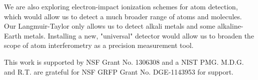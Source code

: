 \documentclass[twocolumn,prl,showpacs,superscriptaddress]{revtex4-1}   %
\begin{document}
We are also exploring electron-impact ionization schemes for atom detection, which would allow us to detect a much broader range of atoms and molecules. Our Langmuir-Taylor only allows us to detect alkali metals and some alkaline-Earth metals. Installing a new, "universal" detector would allow us to broaden the scope of atom interferometry as a precision measurement tool. 

This work is supported by NSF Grant No. 1306308 and a NIST PMG. M.D.G. and R.T. are grateful for NSF GRFP Grant No. DGE-1143953 for support. 


%

\end{document}
